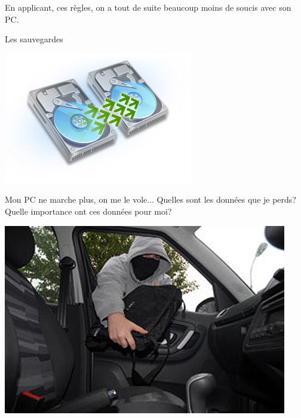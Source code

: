\documentclass{beamer}
\begin{document}
\begin{frame}
\begin{center}
\Huge{En applicant, ces règles, on a tout de suite beaucoup moins de soucis avec son PC.}
\end{center}
\end{frame}


\begin{frame}
\begin{center}
\Huge{Les sauvegardes}

\includegraphics[scale=0.5] {./images/backup.jpg}
\end{center}
\end{frame}

\begin{frame}
\begin{center}
\Huge{Mon PC ne marche plus, on me le vole...
Quelles sont les données que je perds?
Quelle importance ont ces données pour moi?
}

\includegraphics[scale=0.5] {./images/laptopthief.jpg}
\end{center}

\end{frame}
\end{document}
